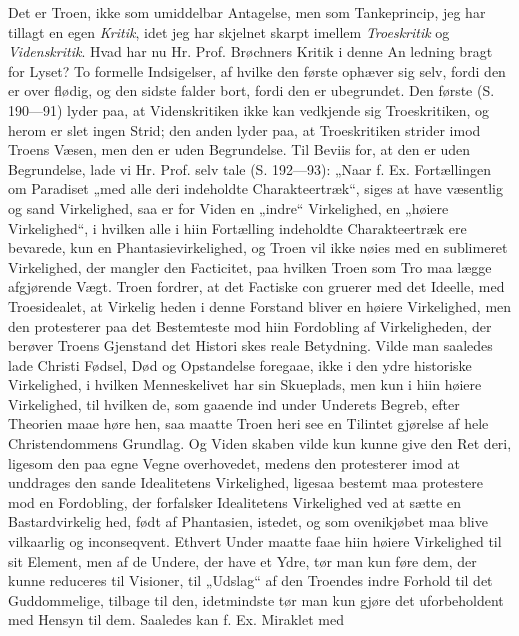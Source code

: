 \documentclass[12pt]{book}
\newcommand{\opage}[1]{\marginnote{\footnotesize\textit{[#1]}}}
\begin{document}
Det er Troen, ikke som umiddelbar Antagelse, men som
Tankeprincip, jeg har tillagt en egen \emph{Kritik}, idet jeg har
skjelnet skarpt imellem \emph{Troeskritik} og \emph{Videnskritik}.
Hvad har nu Hr. Prof. Brøchners Kritik i denne An\-%
ledning bragt for Lyset? To formelle Indsigelser, af
hvilke den første ophæver sig selv, fordi den er over\-%
flødig, og den sidste falder bort, fordi den er ubegrundet.
Den første (S. 190---91) lyder paa, at Videnskritiken
ikke kan vedkjende sig Troeskritiken, og herom er slet
\opage{5}\setcounter{footnote}{0}%
ingen Strid; den anden lyder paa, at Troeskritiken strider
imod Troens Væsen, men den er uden Begrundelse.
Til Beviis for, at den er uden Begrundelse, lade vi Hr.
Prof. selv tale (S. 192---93): „Naar f. Ex. Fortællingen
om Paradiset „med alle deri indeholdte Charakteertræk“,
siges at have væsentlig og sand Virkelighed, saa er for
Viden en „indre“ Virkelighed, en „høiere Virkelighed“,
i hvilken alle i hiin Fortælling indeholdte Charakteertræk
ere bevarede, kun en Phantasievirkelighed, og Troen vil
ikke nøies med en sublimeret Virkelighed, der mangler
den Facticitet, paa hvilken Troen som Tro maa lægge
afgjørende Vægt. Troen fordrer, at det Factiske con\-%
gruerer med det Ideelle, med Troesidealet, at Virkelig\-%
heden i denne Forstand bliver en høiere Virkelighed, men
den protesterer paa det Bestemteste mod hiin Fordobling
af Virkeligheden, der berøver Troens Gjenstand det Histori\-%
skes reale Betydning. Vilde man saaledes lade Christi
Fødsel, Død og Opstandelse foregaae, ikke i den ydre
historiske Virkelighed, i hvilken Menneskelivet har sin
Skueplads, men kun i hiin høiere Virkelighed, til hvilken
de, som gaaende ind under Underets Begreb, efter Theorien
maae høre hen, saa maatte Troen heri see en Tilintet\-%
gjørelse af hele Christendommens Grundlag. Og Viden\-%
skaben vilde kun kunne give den Ret deri, ligesom den
paa egne Vegne overhovedet, medens den protesterer imod
at unddrages den sande Idealitetens Virkelighed, ligesaa
bestemt maa protestere mod en Fordobling, der forfalsker
Idealitetens Virkelighed ved at sætte en Bastardvirkelig\-%
hed, født af Phantasien, istedet, og som ovenikjøbet maa
blive vilkaarlig og inconseqvent. Ethvert Under maatte
faae hiin høiere Virkelighed til sit Element, men af de
Undere, der have et Ydre, tør man kun føre dem,
der kunne reduceres til Visioner, til „Udslag“ af den
Troendes indre Forhold til det Guddommelige, tilbage
\opage{6}\setcounter{footnote}{0}%
til den, idetmindste tør man kun gjøre det uforbeholdent
med Hensyn til dem. Saaledes kan f. Ex. Miraklet med
\end{document}
